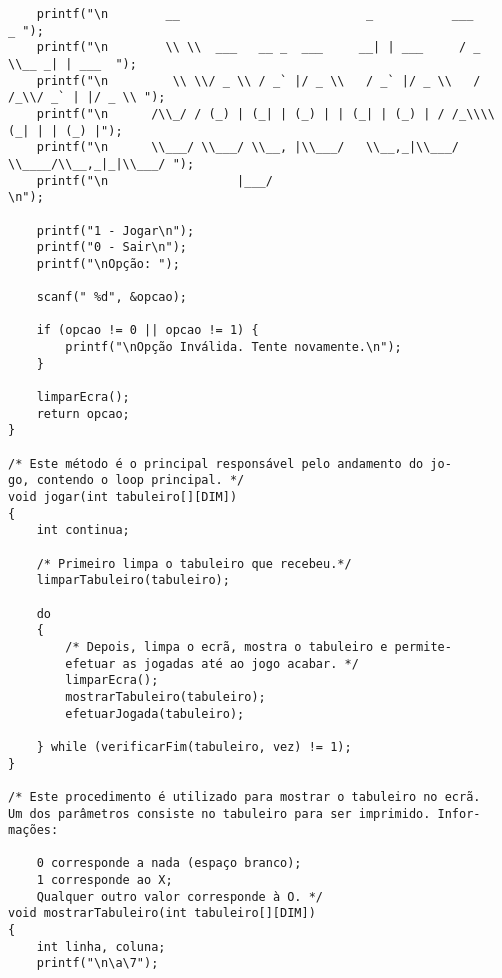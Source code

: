\begin{lstlisting}
	printf("\n        __                          _           ___      _ ");
	printf("\n        \\ \\  ___   __ _  ___     __| | ___     / _ \\__ _| | ___  ");
	printf("\n         \\ \\/ _ \\ / _` |/ _ \\   / _` |/ _ \\   / /_\\/ _` | |/ _ \\ ");
	printf("\n      /\\_/ / (_) | (_| | (_) | | (_| | (_) | / /_\\\\ (_| | | (_) |");
	printf("\n      \\___/ \\___/ \\__, |\\___/   \\__,_|\\___/  \\____/\\__,_|_|\\___/ ");
	printf("\n                  |___/                                          \n");

	printf("1 - Jogar\n");
	printf("0 - Sair\n");
	printf("\nOpção: ");

	scanf(" %d", &opcao);

	if (opcao != 0 || opcao != 1) {
		printf("\nOpção Inválida. Tente novamente.\n");
	}

	limparEcra();
	return opcao;
}

/* Este método é o principal responsável pelo andamento do jo-
go, contendo o loop principal. */
void jogar(int tabuleiro[][DIM])
{
	int continua;

	/* Primeiro limpa o tabuleiro que recebeu.*/
	limparTabuleiro(tabuleiro);

	do
	{
		/* Depois, limpa o ecrã, mostra o tabuleiro e permite-
		efetuar as jogadas até ao jogo acabar. */
		limparEcra();
		mostrarTabuleiro(tabuleiro);
		efetuarJogada(tabuleiro);

	} while (verificarFim(tabuleiro, vez) != 1);
}

/* Este procedimento é utilizado para mostrar o tabuleiro no ecrã.
Um dos parâmetros consiste no tabuleiro para ser imprimido. Infor-
mações:

	0 corresponde a nada (espaço branco);
	1 corresponde ao X;
	Qualquer outro valor corresponde à O. */
void mostrarTabuleiro(int tabuleiro[][DIM])
{
	int linha, coluna;
	printf("\n\a\7");


\end{lstlisting}
